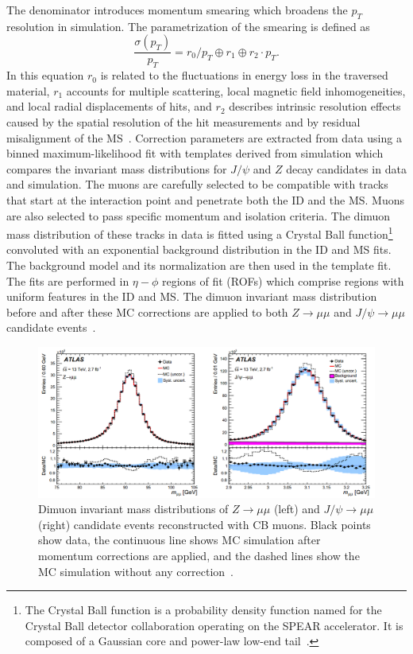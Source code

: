 The denominator introduces momentum smearing which broadens the $p_T$ resolution in simulation. The parametrization of the smearing is defined as
\begin{equation}
    \frac{\sigma(p_T)}{p_T} = r_0/p_T \oplus r_1 \oplus r_2 \cdot p_T .
\end{equation}
In this equation $r_0$ is related to the fluctuations in energy loss in the traversed material, $r_1$ accounts for multiple scattering, local magnetic field inhomogeneities, and local radial displacements of hits, and $r_2$ describes intrinsic resolution effects caused by the spatial resolution of the hit measurements and by residual misalignment of the MS~\cite{MCPpaper}. 
Correction parameters are extracted from data using a binned maximum-likelihood fit with templates derived from simulation which compares the invariant mass distributions for $J/\psi$ and $Z$ decay candidates in data and simulation. The muons are carefully selected to be compatible with tracks that start at the interaction point and penetrate both the ID and the MS. Muons are also selected to pass specific momentum and isolation criteria. The dimuon mass distribution of these tracks in data is fitted using a Crystal Ball function\footnote{The Crystal Ball function is a probability density function named for the Crystal Ball detector collaboration operating on the SPEAR accelerator. It is composed of a Gaussian core and power-law low-end tail~\cite{CrystalBall}.} convoluted with an exponential background distribution in the ID and MS fits. The background model and its normalization are then used in the template fit. The fits are performed in $\eta-\phi$ regions of fit (ROFs) which comprise regions with uniform features in the ID and MS. The dimuon invariant mass distribution before and after these MC corrections are applied to both $Z\rightarrow\mu\mu$ and $J/\psi\rightarrow\mu\mu$ candidate events~\cite{MCPpaper}. 

\begin{figure}[!h]
        \centering
    \includegraphics[width=.85\textwidth]{Pictures/dimuonmassfits.png}
    \caption{ Dimuon invariant mass distributions of $Z\rightarrow\mu\mu$ (left) and $J/\psi\rightarrow\mu\mu$ (right) candidate events reconstructed with CB muons. Black points show data, the continuous line shows MC simulation after momentum corrections are applied, and the dashed lines show the MC simulation without any correction~\cite{MCPpaper}.}
    \label{fig:dimuonmassfits}
\end{figure}

